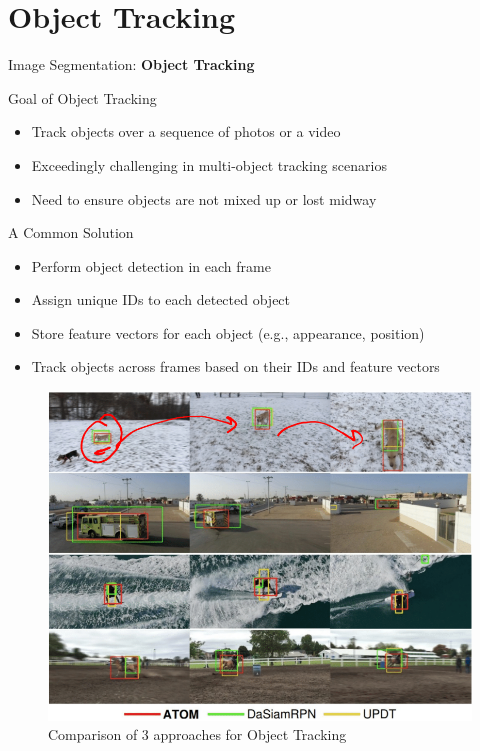 \section{Object Tracking}
\begin{frame}{}
    \LARGE Image Segmentation: \textbf{Object Tracking}
\end{frame}

\begin{frame}{Goal of Object Tracking}
    \begin{itemize}
        \item Track objects over a sequence of photos or a video
        \item Exceedingly challenging in multi-object tracking scenarios
        \item Need to ensure objects are not mixed up or lost midway
    \end{itemize}
\end{frame}

\begin{frame}[allowframebreaks]{A Common Solution}
    \begin{itemize}
        \item Perform object detection in each frame
        \item Assign unique IDs to each detected object
        \item Store feature vectors for each object (e.g., appearance, position)
        \item Track objects across frames based on their IDs and feature vectors
    \end{itemize}
\framebreak
    \begin{figure}
        \centering
        \includegraphics[width=1.0\textwidth,height=0.8\textheight,keepaspectratio]{images/segmentation/obj-tracking.png}
        \caption*{Comparison of 3 approaches for Object Tracking}
    \end{figure}
\end{frame}